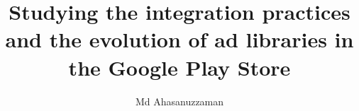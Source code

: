 

   


\usepackage{natbib}

\usepackage{caption}
\usepackage{lipsum}
\usepackage{fancyhdr}
\usepackage{longtable}
\usepackage[flushleft]{threeparttable}
\usepackage{tabu}
\fancyfoot{}
\fancyhead[RO,LE]{\thepage}
\fancyhead[LO]{\leftmark}
\fancyhead[RE]{\rightmark}
\usepackage[toc,page]{appendix}
\newcommand{\smalltt}[1]{\ifmmode{\mbox{\smaller\texttt{#1}}}\else{\smaller\tt #1}\fi}
\newcommand{\code}[1]{\smalltt{#1}}





\title{Studying the integration practices and the evolution of ad libraries in the Google Play Store}

\author{Md Ahasanuzzaman}


\beforepreface
\singlespacing  \doublespacing



\setlength{\abovedisplayskip}{3pt plus1pt minus1pt}
\setlength{\abovedisplayshortskip}{3pt plus1pt minus1pt}
\setlength{\belowdisplayskip}{3pt plus1pt minus1pt}
\setlength{\belowdisplayshortskip}{3pt plus1pt minus1pt}


 

%
 

\addtables
\pagestyle{fancy}




%






%



